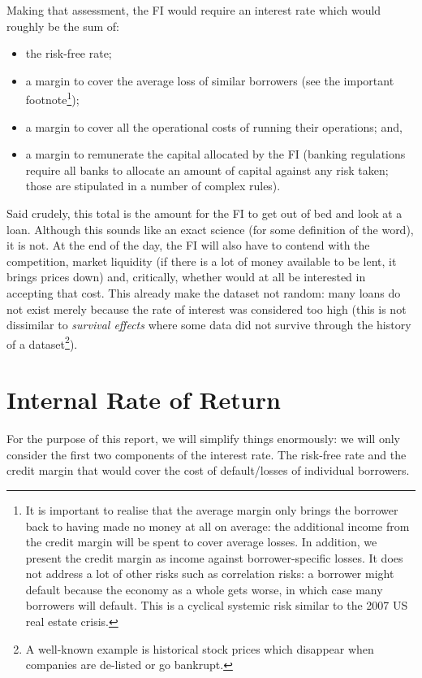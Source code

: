 \documentclass[11pt,]{report}
\let\rmarkdownfootnote\footnote%
\def\footnote{\protect\rmarkdownfootnote}
\begin{document}
Making that assessment, the FI would require an interest rate which would roughly be the sum of:

\begin{itemize}
\item
  the risk-free rate;
\item
  a margin to cover the average loss of similar borrowers (see the important footnote\footnote{It is important to realise that the average margin only brings the borrower back to having made no money at all on average: the additional income from the credit margin will be spent to cover average losses. In addition, we present the credit margin as income against borrower-specific losses. It does not address a lot of other risks such as correlation risks: a borrower might default because the economy as a whole gets worse, in which case many borrowers will default. This is a cyclical systemic risk similar to the 2007 US real estate crisis.});
\item
  a margin to cover all the operational costs of running their operations; and,
\item
  a margin to remunerate the capital allocated by the FI (banking regulations require all banks to allocate an amount of capital against any risk taken; those are stipulated in a number of complex rules).
\end{itemize}

Said crudely, this total is the amount for the FI to get out of bed and look at a loan. Although this sounds like an exact science (for some definition of the word), it is not. At the end of the day, the FI will also have to contend with the competition, market liquidity (if there is a lot of money available to be lent, it brings prices down) and, critically, whether would at all be interested in accepting that cost. This already make the dataset not random: many loans do not exist merely because the rate of interest was considered too high (this is not dissimilar to \emph{survival effects} where some data did not survive through the history of a dataset\footnote{A well-known example is historical stock prices which disappear when companies are de-listed or go bankrupt.}).

\hypertarget{internal-rate-of-return}{%
\section{Internal Rate of Return}\label{internal-rate-of-return}}

For the purpose of this report, we will simplify things enormously: we will only consider the first two components of the interest rate. The risk-free rate and the credit margin that would cover the cost of default/losses of individual borrowers.
\end{document}
